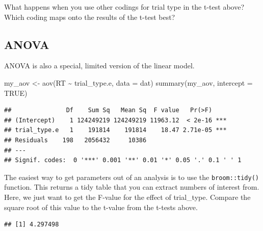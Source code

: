 \documentclass[
  oneside]{book}
\newenvironment{Shaded}{\begin{snugshade}}{\end{snugshade}}
\newcommand{\AttributeTok}[1]{\textcolor[rgb]{0.77,0.63,0.00}{#1}}
\newcommand{\ConstantTok}[1]{\textcolor[rgb]{0.00,0.00,0.00}{#1}}
\newcommand{\DecValTok}[1]{\textcolor[rgb]{0.00,0.00,0.81}{#1}}
\newcommand{\FunctionTok}[1]{\textcolor[rgb]{0.00,0.00,0.00}{#1}}
\newcommand{\NormalTok}[1]{#1}
\newcommand{\OtherTok}[1]{\textcolor[rgb]{0.56,0.35,0.01}{#1}}
\newcommand{\SpecialCharTok}[1]{\textcolor[rgb]{0.00,0.00,0.00}{#1}}
\begin{document}
\begin{try}
What happens when you use other codings for trial type in the t-test above? Which coding maps onto the results of the t-test best?

\end{try}

\hypertarget{anova}{%
\subsection{ANOVA}\label{anova}}

ANOVA is also a special, limited version of the linear model.

\begin{Shaded}
\begin{Highlighting}[]
\NormalTok{my\_aov }\OtherTok{\textless{}{-}} \FunctionTok{aov}\NormalTok{(RT }\SpecialCharTok{\textasciitilde{}}\NormalTok{ trial\_type.e, }\AttributeTok{data =}\NormalTok{ dat)}
\FunctionTok{summary}\NormalTok{(my\_aov, }\AttributeTok{intercept =} \ConstantTok{TRUE}\NormalTok{)}
\end{Highlighting}
\end{Shaded}

\begin{verbatim}
##               Df    Sum Sq   Mean Sq  F value   Pr(>F)    
## (Intercept)    1 124249219 124249219 11963.12  < 2e-16 ***
## trial_type.e   1    191814    191814    18.47 2.71e-05 ***
## Residuals    198   2056432     10386                      
## ---
## Signif. codes:  0 '***' 0.001 '**' 0.01 '*' 0.05 '.' 0.1 ' ' 1
\end{verbatim}

The easiest way to get parameters out of an analysis is to use the \texttt{broom::tidy()} function. This returns a tidy table that you can extract numbers of interest from. Here, we just want to get the F-value for the effect of trial\_type. Compare the square root of this value to the t-value from the t-tests above.

\begin{Shaded}
\end{Shaded}

\begin{verbatim}
## [1] 4.297498
\end{verbatim}
\end{document}

